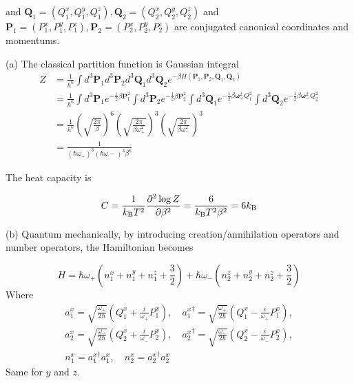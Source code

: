 \documentclass[a4paper,11pt]{article}
\begin{document}
and $\mathbf Q_1=(Q_1^x, Q_1^y, Q_1^z), \mathbf Q_2=(Q_2^x, Q_2^y, Q_2^z)$ and $\mathbf P_1=(P_1^x, P_1^y, P_1^z), \mathbf P_2=(P_2^x, P_2^y, P_2^z)$ are conjugated canonical coordinates and momentums.

(a) The classical partition function is Gaussian integral
\begin{align}
    Z &= \frac{1}{h^6}\int d^3\mathbf P_1 d^3\mathbf P_2 d^3\mathbf Q_1 d^3\mathbf Q_2
    e^{-\beta H(\mathbf P_1, \mathbf P_2, \mathbf Q_1, \mathbf Q_2)}\\
    &= \frac{1}{h^6}\int d^3\mathbf P_1 e^{-\frac{1}{2}\beta \mathbf P_1^2}\int d^3\mathbf P_2 e^{-\frac{1}{2}\beta \mathbf P_2^2}\int d^3\mathbf Q_1 e^{-\frac{1}{2}\beta \mathbf \omega^2_+Q_1^2}\int d^3\mathbf Q_2 e^{-\frac{1}{2}\beta \mathbf \omega^2_-Q_2^2}\\
    &=\frac{1}{h^6}\left(\sqrt{\frac{2\pi}{\beta}}\right)^6\left(\sqrt{\frac{2\pi}{\beta\omega_+^2}}\right)^3\left(\sqrt{\frac{2\pi}{\beta\omega_-^2}}\right)^3\\
    &=\frac{1}{(\hbar\omega_+)^3(\hbar\omega-)^3\beta^6}
\end{align}

The heat capacity is

\begin{equation}
    C = \frac{1}{k_{\mathrm{B}} T^2}\frac{\partial^2\log Z}{\partial \beta^2} = \frac{6}{k_{\mathrm{B}} T^2\beta^2}=6k_{\mathrm{B}}
\end{equation}

(b) Quantum mechanically, by introducing creation/annihilation operators and number operators, the Hamiltonian becomes

\begin{equation}
    H = \hbar\omega_+\left(n^x_1+n^y_1+n^z_1+\frac{3}{2}\right) + \hbar\omega_-\left(n^z_2+n^y_2+n^z_2+\frac{3}{2}\right)
\end{equation}
Where
\begin{gather}
    {a_1^{x}} = \sqrt{\frac{\omega_+}{2\hbar}}\left({Q_1^{x}}+\frac{i}{\omega_+}{P_1^{x}}\right),\quad 
    {a_1^{x}}^\dagger = \sqrt{\frac{\omega_+}{2\hbar}}\left({Q_1^{x}}-\frac{i}{\omega_+}{P_1^{x}}\right),\\
    {a_2^{x}} = \sqrt{\frac{\omega_-}{2\hbar}}\left({Q_2^{x}}+\frac{i}{\omega_-}{P_2^{x}}\right),\quad 
    {a_2^{x}}^\dagger = \sqrt{\frac{\omega_-}{2\hbar}}\left({Q_2^{x}}-\frac{i}{\omega_-}{P_2^{x}}\right),\\
    {n_1^{x}}={a_1^{x}}^\dagger {a_1^{x}},\quad {n_2^{x}}={a_2^{x}}^\dagger {a_2^{x}}
\end{gather}
Same for $y$ and $z$.
\end{document}
